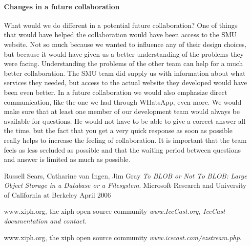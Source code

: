 \documentclass[a4paper,11pt,report]{article}
\begin{document}
\paragraph{Changes in a future collaboration}
What would we do different in a potential future collaboration? One of things that would have helped the collaboration would have been access to the SMU website. Not so much because we wanted to influence any of their design choices, but because it would have given us a better understanding of the problems they were facing. Understanding the problems of the other team can help for a much better collaboration. The SMU team did supply us with information about what services they needed, but access to the actual website they developed would have been even better. In a future collaboration we would also emphasize direct communication, like the one we had through WHatsApp, even more. We would make sure that at least one member of our development team would always be available for questions. He would not have to be able to give a correct answer all the time, but the fact that you get a very quick response as soon as possible really helps to increase the feeling of collaboration. It is important that the team feels as less secluded as possible and that the waiting period between questions and answer is limited as much as possible. 

\begin{thebibliography}{9}
  Russell Sears, Catharine van Ingen, Jim Gray
  \emph{To BLOB or Not To BLOB: 
Large Object Storage in a Database or a Filesystem}.
  Microsoft Research and University of California at Berkeley
  April 2006
  
  www.xiph.org, the xiph open source community
  \emph{www.IceCast.org, IceCast documentation and contact}.
    
  www.xiph.org, the xiph open source community
  \emph{www.icecast.com/ezstream.php}.
\end{thebibliography}
\end{document}
